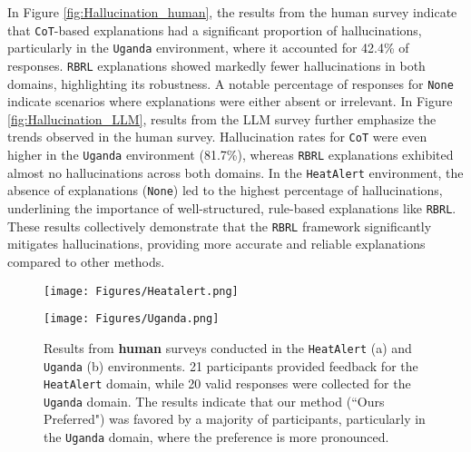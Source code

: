 In Figure \ref{fig:Hallucination_human}, the results from the human survey indicate that \texttt{CoT}-based explanations had a significant proportion of hallucinations, particularly in the \texttt{Uganda} environment, where it accounted for 42.4\% of responses. \texttt{RBRL} explanations showed markedly fewer hallucinations in both domains, highlighting its robustness. A notable percentage of responses for \texttt{None} indicate scenarios where explanations were either absent or irrelevant.
In Figure \ref{fig:Hallucination_LLM}, results from the LLM survey further emphasize the trends observed in the human survey. Hallucination rates for \texttt{CoT} were even higher in the \texttt{Uganda} environment (81.7\%), whereas \texttt{RBRL} explanations exhibited almost no hallucinations across both domains. In the \texttt{HeatAlert} environment, the absence of explanations (\texttt{None}) led to the highest percentage of hallucinations, underlining the importance of well-structured, rule-based explanations like \texttt{RBRL}.
These results collectively demonstrate that the \texttt{RBRL} framework significantly mitigates hallucinations, providing more accurate and reliable explanations compared to other methods.

 

\begin{figure}[H]
\centering
\begin{minipage}{.4\textwidth}
\centering
\texttt{[image: Figures/Heatalert.png]}
 \label{fig:heatalert_human}
\end{minipage}\hfill
\begin{minipage}{.4\textwidth}
\centering
\texttt{[image: Figures/Uganda.png]}
 \label{fig:Uganda_human}
\end{minipage}
\caption{Results from \textbf{human} surveys conducted in the \texttt{HeatAlert} (a) and \texttt{Uganda} (b) environments. 21 participants provided feedback for the \texttt{HeatAlert} domain, while 20 valid responses were collected for the \texttt{Uganda} domain. The results indicate that our method (``Ours Preferred") was favored by a majority of participants, particularly in the \texttt{Uganda} domain, where the preference is more pronounced.}
        \label{fig:survey_humans}
\end{figure}



